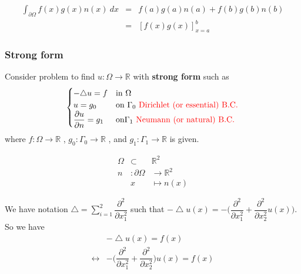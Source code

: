 \documentclass[a4paper,10pt]{article}
\begin{document}
\vspace{2cm}

\begin{eqnarray}\nonumber
\int_{\partial \Omega} f(x) g(x) n(x) \ dx & = & f(a)g(a)n(a) + f(b)g(b)n(b) \\ \nonumber
& = & [f(x)g(x)]_{x=a}^{b}
\end{eqnarray}


\subsubsection{Strong form}
Consider problem to find $ u : \Omega \rightarrow \mathbb{R} $ with \textbf{strong form} such as 
\begin{equation}\label{strong_form}
\begin{cases}
-\triangle u = f & \text{in } \Omega\\
u = g_{0} & \text{on } \Gamma_{0} \ \text{\textcolor{red}{Dirichlet (or essential) B.C.}} \\
\dfrac{\partial u }{\partial n} = g_{1} & \text{on} \Gamma_{1} \ \text{\textcolor{red}{Neumann (or natural) B.C. }}
\end{cases}
\end{equation}
where $ f : \Omega \rightarrow \mathbb{R} $ , $ g_{0} : \Gamma_{0} \rightarrow \mathbb{R} $ , and $ g_{1} : \Gamma_{1} \rightarrow \mathbb{R} $ is given.

\vspace{4cm}

\begin{eqnarray}\nonumber
\Omega &\subset &\mathbb{R}^2 \\ \nonumber
n &: \partial \Omega &\rightarrow \mathbb{R}^2 \\ \nonumber
&x &\mapsto n(x)
\end{eqnarray}

We have notation $ \bigtriangleup = \sum_{i=1}^{2} \dfrac{\partial^2}{\partial x_{1}^{2}} $ such that $ -\bigtriangleup u(x) = -\big( \dfrac{\partial^{2}}{\partial x_{1}^{2}} + \dfrac{\partial^{2}}{\partial x_{2}^{2}} u(x) \big) $. So we have
\begin{eqnarray}\nonumber
& -\bigtriangleup u(x) = f(x) \\ \nonumber
\leftrightarrow &  - \big( \dfrac{\partial^{2}}{\partial x_{1}^{2}} + \dfrac{\partial^{2}}{\partial x_{2}^{2}} \big) u(x) = f(x)
\end{eqnarray}
\end{document}
